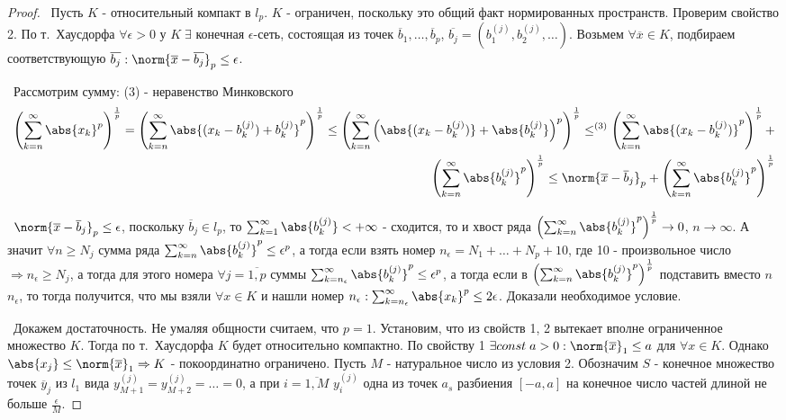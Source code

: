 \begin{proof}
\smallskip\par\noindent\textbullet~Пусть $K$ - относительный компакт в $l_p$. $K$ - ограничен, поскольку это общий факт нормированных пространств. Проверим свойство 2. 
По т.~Хаусдорфа $\forall \epsilon > 0$ у $K \; \exists$ конечная $\epsilon$-сеть, состоящая из точек $\overline{b}_1, \dots, \overline{b}_p$, $\overline{b_j} = (b_1^{(j)},
b_2^{(j)}, \dots)$. Возьмем $\forall \overline{x} \in K$, подбираем соответствующую $\overline{b_j} : \norm{\overline{x} - \overline{b_j}}_p \le \epsilon$. 

\smallskip 
\noindent\textbullet~Рассмотрим сумму: (3) - неравенство Минковского
\begin{align*}
    \left( \sum_{k = n}^\infty \abs{x_k}^p\right)^\frac{1}{p} = \left( \sum_{k = n}^\infty \abs{(x_k - b_k^{(j)}) + b_k^{(j)}}^p \right)^\frac{1}{p} \le 
    \left( \sum_{k = n}^\infty \left(\abs{(x_k - b_k^{(j)})} + \abs{b_k^{(j)}}\right)^p \right)^\frac{1}{p} \le^{(3)} 
    \left( \sum_{k = n}^\infty \abs{(x_k - b_k^{(j)})}^p\right)^\frac{1}{p} + \\ \left(\sum_{k = n}^\infty \abs{b_k^{(j)}}^p \right)^\frac{1}{p} \le 
    \norm{\overline{x} - \overline{b}_j}_p + \left(\sum_{k = n}^\infty \abs{b_k^{(j)}}^p \right)^\frac{1}{p} 
\end{align*}

\noindent\textbullet~$\norm{\overline{x} - \overline{b}_j}_p \le \epsilon$, поскольку $\overline{b}_j \in l_p$, то $\sum_{k = 1}^\infty \abs{b_k^{(j)}} < + \infty$ - 
сходится, то и хвост ряда $\left(\sum_{k = n}^\infty \abs{b_k^{(j)}}^p \right)^\frac{1}{p} \to 0$, $n \to \infty$. А значит $\forall n \ge N_j$ сумма ряда $ \sum_{k = n}^\infty \abs{b_k^{(j)}}^p \le \epsilon^p$, а тогда если взять номер $n_\epsilon = N_1 + \dots + N_p + 10$, где 10 - произвольное число $\Rightarrow n_\epsilon \ge N_j$,
а тогда для этого номера $\forall j = \overline{1, p}$ суммы $\sum_{k = n_\epsilon}^\infty \abs{b_k^{(j)}}^p \le \epsilon^p$, а тогда если в
$\left(\sum_{k = n}^\infty \abs{b_k^{(j)}}^p \right)^\frac{1}{p}$ подставить вместо $n$ $n_\epsilon$, то тогда получится, что мы взяли $\forall x \in K$ и нашли номер $n_\epsilon : \sum_{k = n_\epsilon}^\infty \abs{x_k}^p \le 2 \epsilon$. Доказали необходимое условие.

\medskip 
\noindent\textbullet~Докажем достаточность. Не умаляя общности считаем, что $p = 1$. Установим, что из свойств 1, 2 вытекает вполне ограниченное множество $K$. Тогда по т.~Хаусдорфа $K$ будет относительно 
компактно. По свойству 1 $\exists const \; a > 0 : \norm{\overline{x}}_1 \le a$ для $\forall x \in K$. Однако $\abs{x_j} \le \norm{\overline{x}}_1 \Rightarrow K$ - 
покоординатно ограничено. Пусть $M$ - натуральное число из условия 2. Обозначим $S$ - конечное множество точек $\overline{y}_j$ из $l_1$ вида $y_{M + 1}^{(j)} = 
y_{M+2}^{(j)} = \dots = 0$, а при $i = \overline{1, M}$ $y_i^{(j)}$ одна из точек $a_s$ разбиения $[-a, a]$ на конечное число частей длиной не больше $\frac{\epsilon}{M}$.


\end{proof}
